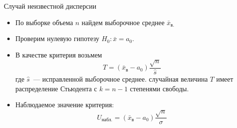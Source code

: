 \documentclass[unicode,11pt,notheorems,xcolor=table]{beamer}
\begin{document}
\begin{frame}{Случай неизвестной дисперсии}{}

    \begin{itemize}
        \item По выборке объема $n$ найдем выборочное среднее 
        $\bar{x}_\text{в.}$
        \item Проверим нулевую гипотезу $H_0\colon \bar{x} = a_0$.
        \item В качестве критерия возьмем
        $$
            T=\left(\bar{x}_\text{в}-a_0\right)\frac{\sqrt{n}}{\hat{s}}
        $$
        где $\hat{s}$~--- исправленной выборочное среднее.
        случайная величина $T$ имеет распределение Стьюдента с $k = n-1$ степенями свободы.
        \item Наблюдаемое значение критерия:
        $$
            U_\text{набл.}=\left(\bar{x}_\text{в}-a_0\right)\frac{\sqrt{n}}{\sigma}
        $$
    \end{itemize}
\end{frame}
\end{document}
